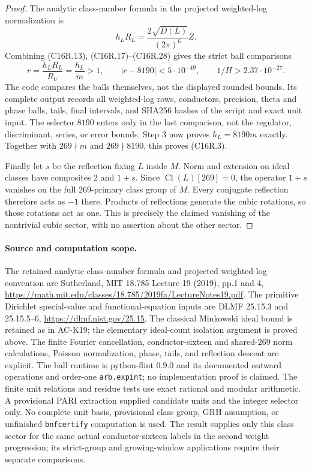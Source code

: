 \begin{proof}
The analytic class-number formula in the projected weighted-log
normalization is
\[
 h_LR_L=\frac{2\sqrt{D(L)}}{(2\pi)^6}Z.
 \tag{C16R.28}
\]
Combining (C16R.13), (C16R.17)--(C16R.28) gives the strict ball
comparisons
\[
 r=\frac{h_LR_L}{R_U}=\frac{h_L}{m}>1,\qquad
 |r-8190|<5\cdot10^{-49},\qquad
 1/H>2.37\cdot10^{-27}.
 \tag{C16R.29}
\]
The code compares the balls themselves, not the displayed rounded
bounds.  Its complete output records all weighted-log rows,
conductors, precision, theta and phase balls, tails, final intervals,
and SHA256 hashes of the script and exact unit input.
The selector $8190$ enters only in the last comparison, not the
regulator, discriminant, series, or error bounds.
Step 3 now proves $h_L=8190m$ exactly.
Together with $269\nmid m$ and $269\nmid8190$, this proves (C16R.3).

Finally let $s$ be the reflection fixing $L$ inside $M$.
Norm and extension on ideal classes have composites $2$ and $1+s$.
Since $\operatorname{Cl}(L)[269]=0$, the operator $1+s$ vanishes
on the full $269$-primary class group of $M$.
Every conjugate reflection therefore acts as $-1$ there.
Products of reflections generate the cubic rotations, so those
rotations act as one.  This is precisely the claimed vanishing
of the nontrivial cubic sector, with no assertion about the other sector.
\end{proof}

\paragraph{Source and computation scope.}
The retained analytic class-number formula and projected weighted-log
convention are Sutherland, MIT 18.785 Lecture 19 (2019), pp.1 and 4,
\url{https://math.mit.edu/classes/18.785/2019fa/LectureNotes19.pdf}.
The primitive Dirichlet special-value and functional-equation inputs
are DLMF 25.15.3 and 25.15.5--6,
\url{https://dlmf.nist.gov/25.15}.
The classical Minkowski ideal bound is retained as in AC-K19;
the elementary ideal-count isolation argument is proved above.
The finite Fourier cancellation, conductor-sixteen and shared-$269$ norm calculations,
Poisson normalization, phase, tails, and reflection descent are explicit.
The ball runtime is python-flint 0.9.0 and its documented outward
operations and order-one \texttt{arb.expint}; no implementation proof
is claimed.  The finite unit relations and residue tests use exact
rational and modular arithmetic.
A provisional PARI extraction supplied candidate units and the integer
selector only.  No complete unit basis, provisional class group,
GRH assumption, or unfinished \texttt{bnfcertify} computation is used.
The result supplies only this class sector for the same actual
conductor-sixteen labels in the second weight progression; its strict-group
and growing-window applications require their separate comparisons.

